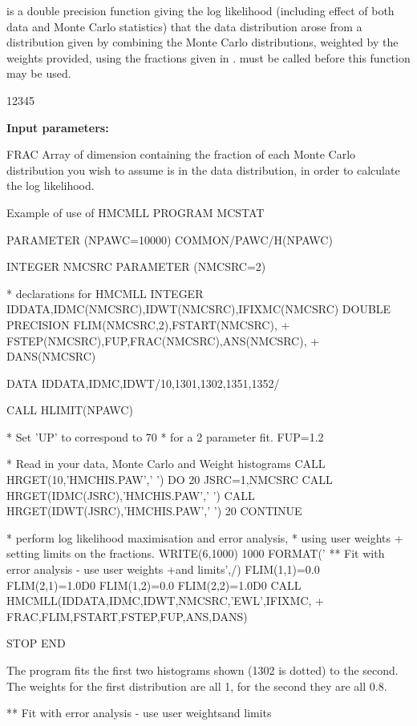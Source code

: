 \begin{changebar}
 
\Action
{} is a double precision function giving the log likelihood
(including effect of both data
and Monte Carlo statistics) that the data distribution arose from a
distribution given by combining the Monte Carlo distributions, weighted
by the weights provided, using the fractions given in .
 must be called before this function may be used.
 
\begin{DLtt}{12345}
\item[{\rm\bf Input parameters:}]
\item[FRAC] Array of dimension  containing the
fraction of each Monte Carlo distribution you wish to assume is in the data
distribution, in order to calculate the log likelihood.
\end{DLtt}
\newpage
\begin{XMPt}{Example of use of HMCMLL}
       PROGRAM MCSTAT
 
       PARAMETER (NPAWC=10000)
       COMMON/PAWC/H(NPAWC)
 
       INTEGER NMCSRC
       PARAMETER (NMCSRC=2)
 
* declarations for HMCMLL
       INTEGER IDDATA,IDMC(NMCSRC),IDWT(NMCSRC),IFIXMC(NMCSRC)
       DOUBLE PRECISION FLIM(NMCSRC,2),FSTART(NMCSRC),
     + FSTEP(NMCSRC),FUP,FRAC(NMCSRC),ANS(NMCSRC),
     + DANS(NMCSRC)
 
       DATA IDDATA,IDMC,IDWT/10,1301,1302,1351,1352/
 
       CALL HLIMIT(NPAWC)
 
* Set 'UP' to correspond to 70%
* for a 2 parameter fit.
       FUP=1.2
 
* Read in your data, Monte Carlo and Weight histograms
       CALL HRGET(10,'HMCHIS.PAW',' ')
       DO 20 JSRC=1,NMCSRC
          CALL HRGET(IDMC(JSRC),'HMCHIS.PAW',' ')
          CALL HRGET(IDWT(JSRC),'HMCHIS.PAW',' ')
20     CONTINUE
 
* perform log likelihood maximisation and error analysis,
* using user weights + setting limits on the fractions.
       WRITE(6,1000)
1000   FORMAT(' ** Fit with error analysis - use user weights
     +and limits',/)
       FLIM(1,1)=0.0
       FLIM(2,1)=1.0D0
       FLIM(1,2)=0.0
       FLIM(2,2)=1.0D0
       CALL HMCMLL(IDDATA,IDMC,IDWT,NMCSRC,'EWL',IFIXMC,
     + FRAC,FLIM,FSTART,FSTEP,FUP,ANS,DANS)
 
       STOP
       END
\end{XMPt}
The program fits the first two histograms shown (1302 is dotted)
to the second.  The weights for the first distribution are all 1,
for the second they are all 0.8.
\newpage
\begin{Listing}
{\scriptsize
 ** Fit with error analysis - use user weightsand limits
 
}
\end{Listing}
\end{changebar}

